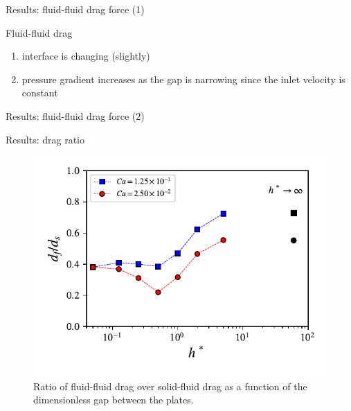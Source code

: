 \documentclass[presentation]{beamer}
\begin{document}
\begin{frame}[label={sec:org75b4b07}]{Results: fluid-fluid drag force (1)}
\begin{alertblock}{Fluid-fluid drag}
\begin{enumerate}
\item interface is changing (slightly)
\item pressure gradient increases as the gap is narrowing since the inlet velocity is constant
\end{enumerate}
\end{alertblock}
\end{frame}

\begin{frame}[label={sec:org76545b5}]{Results: fluid-fluid drag force (2)}
\end{frame}
\begin{frame}[label={sec:orgfc92227}]{Results: drag ratio}
\begin{figure}
\centering
\includegraphics[scale=0.8]{RESULTS_dragRatio.pdf}
\caption{Ratio of fluid-fluid drag over solid-fluid drag as a function of the dimensionless gap
 between the plates.}
\end{figure}
\end{frame}
\end{document}
